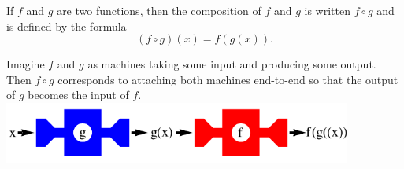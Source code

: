 \begin{frame}
\begin{definition}
If $f$ and $g$ are two functions, then the composition of $f$ and $g$ is written $f\circ g$ and is defined by the formula
\[
(f\circ g)(x) = f(g(x)).
\]
\end{definition}

Imagine $f$ and $g$ as machines taking some input and producing some output. Then $f\circ g$ corresponds to attaching both machines end-to-end so that the output of $g$ becomes the input of $f$.
\includegraphics[height=2cm]{precalculus/pictures/01-03-machines.pdf}%

\end{frame}
